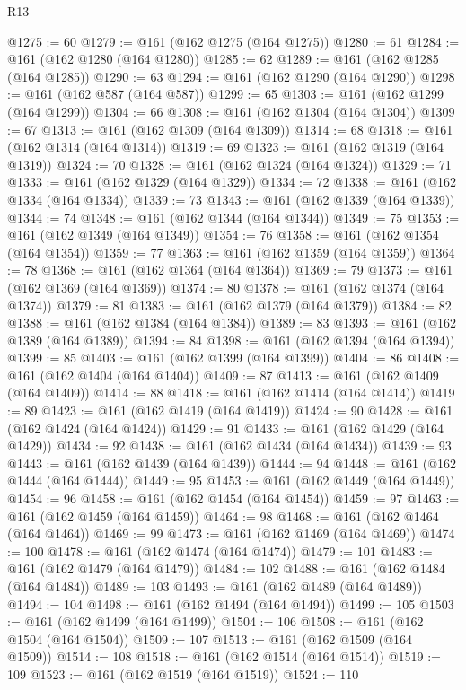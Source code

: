 \begin{lexlean}{R13}
\begin{coremodule}
@1275 := 60
@1279 := @161 (@162 @1275 (@164 @1275))
@1280 := 61
@1284 := @161 (@162 @1280 (@164 @1280))
@1285 := 62
@1289 := @161 (@162 @1285 (@164 @1285))
@1290 := 63
@1294 := @161 (@162 @1290 (@164 @1290))
@1298 := @161 (@162 @587 (@164 @587))
@1299 := 65
@1303 := @161 (@162 @1299 (@164 @1299))
@1304 := 66
@1308 := @161 (@162 @1304 (@164 @1304))
@1309 := 67
@1313 := @161 (@162 @1309 (@164 @1309))
@1314 := 68
@1318 := @161 (@162 @1314 (@164 @1314))
@1319 := 69
@1323 := @161 (@162 @1319 (@164 @1319))
@1324 := 70
@1328 := @161 (@162 @1324 (@164 @1324))
@1329 := 71
@1333 := @161 (@162 @1329 (@164 @1329))
@1334 := 72
@1338 := @161 (@162 @1334 (@164 @1334))
@1339 := 73
@1343 := @161 (@162 @1339 (@164 @1339))
@1344 := 74
@1348 := @161 (@162 @1344 (@164 @1344))
@1349 := 75
@1353 := @161 (@162 @1349 (@164 @1349))
@1354 := 76
@1358 := @161 (@162 @1354 (@164 @1354))
@1359 := 77
@1363 := @161 (@162 @1359 (@164 @1359))
@1364 := 78
@1368 := @161 (@162 @1364 (@164 @1364))
@1369 := 79
@1373 := @161 (@162 @1369 (@164 @1369))
@1374 := 80
@1378 := @161 (@162 @1374 (@164 @1374))
@1379 := 81
@1383 := @161 (@162 @1379 (@164 @1379))
@1384 := 82
@1388 := @161 (@162 @1384 (@164 @1384))
@1389 := 83
@1393 := @161 (@162 @1389 (@164 @1389))
@1394 := 84
@1398 := @161 (@162 @1394 (@164 @1394))
@1399 := 85
@1403 := @161 (@162 @1399 (@164 @1399))
@1404 := 86
@1408 := @161 (@162 @1404 (@164 @1404))
@1409 := 87
@1413 := @161 (@162 @1409 (@164 @1409))
@1414 := 88
@1418 := @161 (@162 @1414 (@164 @1414))
@1419 := 89
@1423 := @161 (@162 @1419 (@164 @1419))
@1424 := 90
@1428 := @161 (@162 @1424 (@164 @1424))
@1429 := 91
@1433 := @161 (@162 @1429 (@164 @1429))
@1434 := 92
@1438 := @161 (@162 @1434 (@164 @1434))
@1439 := 93
@1443 := @161 (@162 @1439 (@164 @1439))
@1444 := 94
@1448 := @161 (@162 @1444 (@164 @1444))
@1449 := 95
@1453 := @161 (@162 @1449 (@164 @1449))
@1454 := 96
@1458 := @161 (@162 @1454 (@164 @1454))
@1459 := 97
@1463 := @161 (@162 @1459 (@164 @1459))
@1464 := 98
@1468 := @161 (@162 @1464 (@164 @1464))
@1469 := 99
@1473 := @161 (@162 @1469 (@164 @1469))
@1474 := 100
@1478 := @161 (@162 @1474 (@164 @1474))
@1479 := 101
@1483 := @161 (@162 @1479 (@164 @1479))
@1484 := 102
@1488 := @161 (@162 @1484 (@164 @1484))
@1489 := 103
@1493 := @161 (@162 @1489 (@164 @1489))
@1494 := 104
@1498 := @161 (@162 @1494 (@164 @1494))
@1499 := 105
@1503 := @161 (@162 @1499 (@164 @1499))
@1504 := 106
@1508 := @161 (@162 @1504 (@164 @1504))
@1509 := 107
@1513 := @161 (@162 @1509 (@164 @1509))
@1514 := 108
@1518 := @161 (@162 @1514 (@164 @1514))
@1519 := 109
@1523 := @161 (@162 @1519 (@164 @1519))
@1524 := 110

\end{coremodule}
\end{lexlean}
